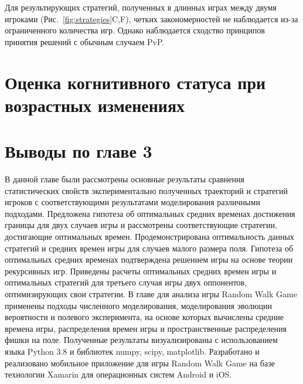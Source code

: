 Для результирующих стратегий, полученных в длинных играх между двумя игроками (Рис.~\cref{fig:strategies}C,F), 
четких закономерностей не наблюдается из-за ограниченного количества игр. 
Однако наблюдается сходство принципов принятия решений с обычным случаем PvP.


\section{Оценка когнитивного статуса при возрастных изменениях}\label{sec:ch3/sec5}

\section{Выводы по главе 3}\label{sec:ch3/sec6}

В данной главе были рассмотрены основные результаты сравнения статистических свойств экспериментально полученных траекторий и стратегий игроков с соответствующими результатами моделирования различными подходами. Предложена гипотеза об оптимальных средних временах достижения границы для двух случаев игры и рассмотрены соответствующие стратегии, достигающие оптимальных времен. Продемонстрирована оптимальность данных стратегий и средних времен игры для случаев малого размера поля. Гипотеза об оптимальных средних временах подтверждена решением игры на основе теории рекурсивных игр. Приведены расчеты оптимальных средних времен игры и оптимальных стратегий для третьего случая игры двух оппонентов, оптимизирующих свои стратегии. В главе для анализа игры Random Walk Game применены подходы численного моделирования, моделирования эволюции вероятности и полевого эксперимента, на основе которых вычислены средние времена игры, распределения времен игры и пространственные распределения фишки на поле. Полученные результаты визуализированы с использованием языка Python 3.8 и библиотек numpy, scipy, matplotlib. Разработано и реализовано мобильное приложение для игры Random Walk Game на базе технологии Xamarin для операционных систем Android и iOS. 